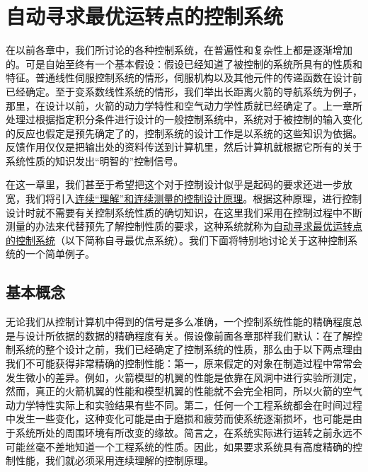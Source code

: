 
\chapter{自动寻求最优运转点的控制系统}

在以前各章中，我们所讨论的各种控制系统，在普遍性和复杂性上都是逐渐增加的。可是自始至终有一个基本假设：假设已经知道了被控制的系统所具有的性质和特征。普通线性伺服控制系统的情形，伺服机构以及其他元件的传递函数在设计前已经确定。至于变系数线性系统的情形，我们举出长距离火箭的导航系统为例子，那里，在设计以前，火箭的动力学特性和空气动力学性质就已经确定了。上一章所处理过根据指定积分条件进行设计的一般控制系统中，系统对于被控制的输入变化的反应也假定是预先确定了的，控制系统的设计工作是以系统的这些知识为依据。反馈作用仅仅是把输出处的资料传送到计算机里，然后计算机就根据它所有的关于系统性质的知识发出“明智的”控制信号。

在这一章里，我们甚至于希望把这个对于控制设计似乎是起码的要求还进一步放宽，我们将引入\underline{连续“理解”和连续测量的控制设计原理}。根据这种原理，进行控制设计时就不需要有关控制系统性质的确切知识，在这里我们采用在控制过程中不断测量的办法来代替预先了解控制性质的要求，这种系统就称为\underline{自动寻求最优运转点的控制系统}（以下简称自寻最优点系统）。我们下面将特别地讨论关于这种控制系统的一个简单例子。

\section{基本概念}

无论我们从控制计算机中得到的信号是多么准确，一个控制系统性能的精确程度总是与设计所依据的数据的精确程度有关。假设像前面各章那样我们默认：在了解控制系统的整个设计之前，我们已经确定了控制系统的性质，那么由于以下两点理由我们不可能获得非常精确的控制性能：第一，原来假定的对象在制造过程中常常会发生微小的差异。例如，火箭模型的机翼的性能是依靠在风洞中进行实验所测定，然而，真正的火箭机翼的性能和模型机翼的性能就不会完全相同，所以火箭的空气动力学特性实际上和实验结果有些不同。第二，任何一个工程系统都会在时间过程中发生一些变化，这种变化可能是由于磨损和疲劳而使系统逐渐损坏，也可能是由于系统所处的周围环境有所改变的缘故。简言之，在系统实际进行运转之前永远不可能丝毫不差地知道一个工程系统的性质。因此，如果要求系统具有高度精确的控制性能，我们就必须采用连续理解的控制原理。

